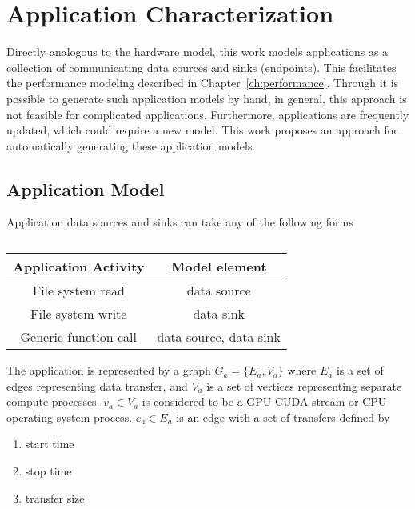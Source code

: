 \chapter{Application Characterization}


Directly analogous to the hardware model, this work models applications as a collection of communicating data sources and sinks (endpoints).
This facilitates the performance modeling described in Chapter~\ref{ch:performance}.
Through it is possible to generate such application models by hand, in general, this approach is not feasible for complicated applications.
Furthermore, applications are frequently updated, which could require a new model.
This work proposes an approach for automatically generating these application models.


\section{Application Model}

Application data sources and sinks can take any of the following forms
\begin{table}[h]
    \centering
    \caption{}
    \label{tab:graph-comparison}
    \begin{tabular}{|c|c|}
    \hline
    \textbf{Application Activity} & \textbf{Model element} \\ \hline
    File system read  & data source \\ \hline
    File system write  & data sink \\ \hline
    Generic function call & data source, data sink \\ \hline
    \end{tabular}
\end{table}

The application is represented by a graph $G_a = \{E_a,V_a\}$ where $E_a$ is a set of edges representing data transfer, and $V_a$ is a set of vertices representing separate compute processes.
$v_a \in V_a$ is considered to be a GPU CUDA stream or CPU operating system process.
$e_a \in E_a$ is an edge with a set of transfers defined by
\begin{enumerate}
    \item start time
    \item stop time
    \item transfer size
\end{enumerate}



